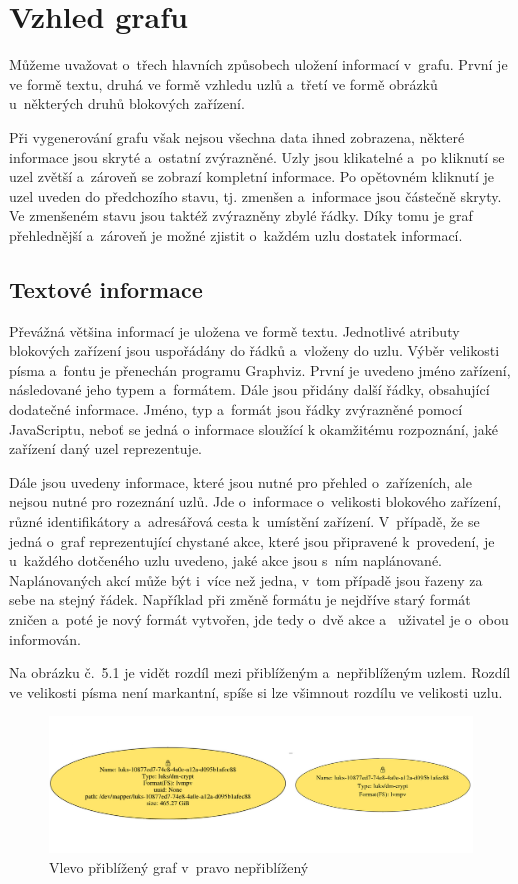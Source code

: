 \documentclass[printed,color,table,oneside,nolot,nolof]{fithesis}
\begin{document}
\chapter{Vzhled grafu}
  Můžeme uvažovat o~třech hlavních způsobech uložení informací v~grafu. První je ve formě textu, druhá ve formě vzhledu uzlů a~třetí ve formě obrázků 
	u~některých druhů blokových zařízení. 

	Při vygenerování grafu však nejsou všechna data ihned zobrazena, některé informace jsou skryté a~ostatní zvýrazněné. Uzly jsou klikatelné a~po kliknutí
	se uzel zvětší a~zároveň se zobrazí kompletní informace. Po opětovném kliknutí je uzel uveden do předchozího stavu, tj. zmenšen a~informace jsou částečně 
	skryty. Ve zmenšeném stavu jsou taktéž zvýrazněny zbylé řádky. Díky tomu je graf přehlednější a~zároveň je možné zjistit o~každém uzlu dostatek informací.

\section{Textové informace}
  Převážná většina informací je uložena ve formě textu. Jednotlivé atributy blokových zařízení jsou uspořádány do řádků a~vloženy do uzlu. Výběr velikosti
	písma a~fontu je přenechán programu Graphviz. První je uvedeno jméno zařízení, následované jeho typem a~formátem. Dále jsou přidány další řádky, 
	obsahující dodatečné informace. Jméno, typ a~formát jsou řádky zvýrazněné pomocí JavaScriptu, neboť se jedná o informace sloužící k okamžitému rozpoznání, jaké zařízení daný uzel reprezentuje.

	Dále jsou uvedeny informace, které jsou nutné pro přehled o~zařízeních, ale nejsou nutné pro rozeznání uzlů. Jde o~informace o~velikosti blokového
	zařízení, různé identifikátory a~adresářová cesta k~umístění zařízení. V~případě, že se jedná o~graf reprezentující chystané akce, které jsou připravené
	k~provedení, je u~každého dotčeného uzlu uvedeno, jaké akce jsou s~ním naplánované. Naplánovaných akcí může být i~více než jedna, v~tom případě jsou
	řazeny za sebe na stejný řádek. Například při změně formátu je nejdříve starý formát zničen a~poté je nový formát vytvořen, jde tedy o~dvě akce a~
	uživatel je o~obou informován.

  Na obrázku č.~5.1 je vidět rozdíl mezi přiblíženým a~nepřiblíženým uzlem. Rozdíl ve velikosti písma není markantní, spíše si lze všimnout rozdílu ve velikosti 
	uzlu.

\begin{figure}[]
	\label{fig:Rozdíly uzlů}
	\caption{Vlevo přiblížený graf v~pravo nepřiblížený}
	\centering
	\includegraphics[width=1.0\columnwidth]{pictures/node_zoom.jpg}
\end{figure}
  
\end{document}
